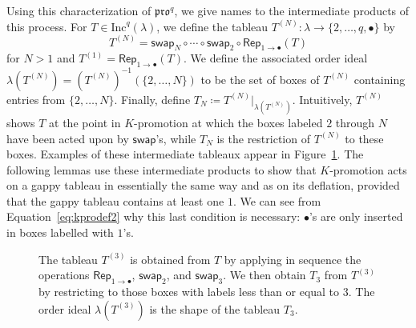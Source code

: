 \documentclass[12pt]{amsart}
\theoremstyle{definition}
\theoremstyle{remark}
\numberwithin{equation}{section}
\newcommand{\inc}{\ensuremath{\mathrm{Inc}}}
\newcommand{\pro}{\mathfrak{pro}}
\newcommand{\swap}{\ensuremath{\mathsf{swap}}}
\newcommand{\rep}{\ensuremath{\mathsf{Rep}}}
\begin{document}
Using this characterization of $\pro^q$, we give names to the intermediate products of this process.
For $T \in \inc^q(\lambda)$, we define the tableau $T^{(N)}: \lambda \rightarrow \lbrace 2, \dots, q, \bullet \rbrace$ by 
\[T^{(N)} = \swap_N \circ \cdots \circ \swap_2 \circ \rep_{1 \rightarrow \bullet}(T)\] for $N > 1$ and $T^{(1)} = \rep_{1 \rightarrow \bullet}(T)$. We define the associated order ideal $\lambda \left( T^{(N)} \right) = \left( T^{(N)} \right)^{-1}(\{2,\dots,N\})$ to be the set of boxes of $T^{(N)}$ containing entries from $\{2,\dots,N\}$. Finally, define $T_N \coloneqq T^{(N)} \vert_{\lambda \left( T^{(N)} \right) }$. Intuitively, $T^{(N)}$ shows $T$ at the point in $K$-promotion at which the boxes labeled $2$ through $N$ have been acted upon by $\swap$'s, while $T_N$ is the restriction of $T^{(N)}$ to these boxes. Examples of these intermediate tableaux appear in Figure~\ref{fig:restricted_promotions}. The following lemmas use these intermediate products to show that $K$-promotion acts on a gappy tableau in essentially the same way and as on its deflation, provided that the gappy tableau contains at least one $1$. We can see from Equation~\ref{eq:kprodef2} why this last condition is necessary: $\bullet$'s are only inserted in boxes labelled with $1$'s.

\begin{figure}[h]
\caption{The tableau $T^{(3)}$ is obtained from $T$ by applying in sequence the operations 
$\rep_{1 \rightarrow \bullet}$, $\swap_2$, and $\swap_3$. 
We then obtain $T_3$ from $T^{(3)}$ by restricting to 
those boxes with labels less than or equal to $3$. The order ideal
 $\lambda \left( T^{(3)} \right)$ is the 
shape of the tableau $T_3$. }\label{fig:restricted_promotions}
\end{figure}
\end{document}
